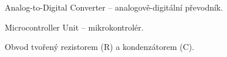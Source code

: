 
\begin{description}[style=nextline,leftmargin=2.8cm,labelwidth=2.5cm]
  \item[ADC] Analog-to-Digital Converter -- analogově-digitální převodník.
  \item[MCU] Microcontroller Unit -- mikrokontrolér.
  \item[RC] Obvod tvořený rezistorem (R) a kondenzátorem (C).
\end{description}
